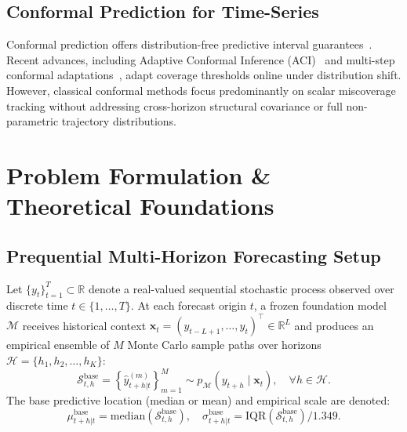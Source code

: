 \documentclass[10pt,journal,compsoc]{IEEEtran}
\begin{document}
\subsection{Conformal Prediction for Time-Series}
Conformal prediction offers distribution-free predictive interval guarantees~\cite{vovk2005algorithmic}. Recent advances, including Adaptive Conformal Inference (ACI)~\cite{gibbs2021adaptive} and multi-step conformal adaptations~\cite{stankeviciute2021conformal, barber2023conformal}, adapt coverage thresholds online under distribution shift. However, classical conformal methods focus predominantly on scalar miscoverage tracking without addressing cross-horizon structural covariance or full non-parametric trajectory distributions.

\section{Problem Formulation \& Theoretical Foundations}

\subsection{Prequential Multi-Horizon Forecasting Setup}
Let $\{y_t\}_{t=1}^T \subset \mathbb{R}$ denote a real-valued sequential stochastic process observed over discrete time $t \in \{1, \dots, T\}$. At each forecast origin $t$, a frozen foundation model $\mathcal{M}$ receives historical context $\mathbf{x}_t = (y_{t-L+1}, \dots, y_t)^\top \in \mathbb{R}^L$ and produces an empirical ensemble of $M$ Monte Carlo sample paths over horizons $\mathcal{H} = \{h_1, h_2, \dots, h_K\}$:
\begin{equation}
\mathcal{S}_{t,h}^{\text{base}} = \left\{ \hat{y}_{t+h|t}^{(m)} \right\}_{m=1}^M \sim p_{\mathcal{M}}(y_{t+h} \mid \mathbf{x}_t), \quad \forall h \in \mathcal{H}.
\end{equation}
The base predictive location (median or mean) and empirical scale are denoted:
\begin{equation}
\mu_{t+h|t}^{\text{base}} = \text{median}\left(\mathcal{S}_{t,h}^{\text{base}}\right), \quad \sigma_{t+h|t}^{\text{base}} = \text{IQR}\left(\mathcal{S}_{t,h}^{\text{base}}\right) / 1.349.
\end{equation}
\end{document}
